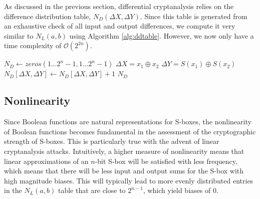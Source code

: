 As discussed in the previous section, differential cryptanalysis relies on the difference distribution table, $N_D(\Delta X, \Delta Y)$. Since this table is generated from an exhaustive check of all input and output differences, we compute it very similar to $N_L(a,b)$ using Algorithm \ref{alg:ddtable}. However, we now only have a time complexity of $\mathcal{O}(2^{2n})$.

\begin{algorithm}[ht!]
\caption{$N_D(S, n)$} \label{alg:ddtable}
\begin{algorithmic}[1]
\State $N_D \gets zeros(1...2^n - 1,1...2^n - 1)$
		\State $\Delta X = x_1 \oplus x_2$
		\State $\Delta Y = S(x_1) \oplus S(x_2)$
		\State $N_D[\Delta X, \Delta Y] \gets N_D[\Delta X, \Delta Y] + 1$
	\EndFor
\EndFor
\State \Return $N_D$
\end{algorithmic}
\end{algorithm}

\subsection{Nonlinearity}
Since Boolean functions are natural representations for S-boxes, the nonlinearity of Boolean functions becomes fundamental in the assessment of the cryptographic strength of S-boxes. This is particularly true with the advent of linear cryptanalysis attacks. Intuitively, a higher measure of nonlinearity means that linear approximations of an $n$-bit S-box will be satisfied with less frequency, which means that there will be less input and output sums for the S-box with high magnitude biases. This will typically lead to more evenly distributed entries in the $N_L(a,b)$ table that are close to $2^{n-1}$, which yield biases of $0$.

